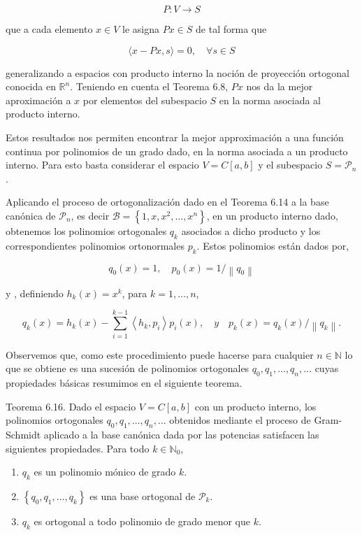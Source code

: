 \documentclass[10pt]{book}
\begin{document}
$$
P: V \longrightarrow S
$$

que a cada elemento $x \in V$ le asigna $P x \in S$ de tal forma que

$$
\langle x-P x, s\rangle=0, \quad \forall s \in S
$$

generalizando a espacios con producto interno la noción de proyección ortogonal conocida en $\mathbb{R}^{n}$. Teniendo en cuenta el Teorema 6.8, $P x$ nos da la mejor aproximación a $x$ por elementos del subespacio $S$ en la norma asociada al producto interno.

Estos resultados nos permiten encontrar la mejor approximación a una función continua por polinomios de un grado dado, en la norma asociada a un producto interno. Para esto basta considerar el espacio $V=C[a, b]$ y el subespacio $S=\mathcal{P}_{n}$.

Aplicando el proceso de ortogonalización dado en el Teorema 6.14 a la base canónica de $\mathcal{P}_{n}$, es decir $\mathcal{B}=\left\{1, x, x^{2}, \ldots, x^{n}\right\}$, en un producto interno dado, obtenemos los polinomios ortogonales $q_{k}$ asociados a dicho producto y los correspondientes polinomios ortonormales $p_{k}$. Estos polinomios están dados por,

$$
q_{0}(x)=1, \quad p_{0}(x)=1 /\left\|q_{0}\right\|
$$

y , definiendo $h_{k}(x)=x^{k}$, para $k=1, \ldots, n$,

$$
q_{k}(x)=h_{k}(x)-\sum_{i=1}^{k-1}\left\langle h_{k}, p_{i}\right\rangle p_{i}(x), \quad y \quad p_{k}(x)=q_{k}(x) /\left\|q_{k}\right\| .
$$

Observemos que, como este procedimiento puede hacerse para cualquier $n \in \mathbb{N}$ lo que se obtiene es una sucesión de polinomios ortogonales $q_{0}, q_{1}, \ldots, q_{n}, \ldots$ cuyas propiedades básicas resumimos en el siguiente teorema.

Teorema 6.16. Dado el espacio $V=C[a, b]$ con un producto interno, los polinomios ortogonales $q_{0}, q_{1}, \ldots, q_{n}, \ldots$ obtenidos mediante el proceso de Gram-Schmidt aplicado a la base canónica dada por las potencias satisfacen las siguientes propiedades. Para todo $k \in \mathbb{N}_{0}$,

\begin{enumerate}
  \item $q_{k}$ es un polinomio mónico de grado $k$.
  \item $\left\{q_{0}, q_{1}, \ldots, q_{k}\right\}$ es una base ortogonal de $\mathcal{P}_{k}$.
  \item $q_{k}$ es ortogonal a todo polinomio de grado menor que $k$.
\end{enumerate}
\end{document}
